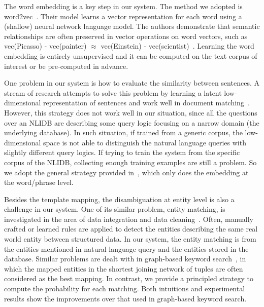 \documentclass{vldb}
\begin{document}
The word embedding is a key step in our system.  The method we adopted is word2vec~\cite{DBLP:journals/corr/abs-1301-3781}.  Their model learns a vector representation for each word using a (shallow) neural network language model.  The authors demonstrate that semantic relationships are often preserved in vector operations on word vectors, such as vec(Picasso) - vec(painter) $\approx$ vec(Einstein) - vec(scientist)~\cite{DBLP:conf/nips/MikolovSCCD13}.  Learning the word embedding is entirely unsupervised and it can be computed on the text corpus of interest or be pre-computed in advance. 

One problem in our system is how to evaluate the similarity between sentences.  A stream of research attempts to solve this problem by learning a latent low-dimensional representation of sentences and work well in document matching~\cite{DBLP:conf/icml/LeM14}.  However, this strategy does not work well in our situation, since all the questions over an NLIDB are describing some query logic focusing on a narrow domain (the underlying database).  In such situation, if trained from a generic corpus, the low-dimensional space is not able to distinguish the natural language queries with slightly different query logics.  If trying to train the system from the specific corpus of the NLIDB, collecting enough training examples are still a problem.  So we adopt the general strategy provided in~\cite{DBLP:conf/icml/KusnerGGW15}, which only does the embedding at the word/phrase level.  

Besides the template mapping, the disambiguation at entity level is also a challenge in our system.  One of its similar problem, entity matching, is investigated in the area of data integration and data cleaning~\cite{DBLP:journals/pvldb/GetoorM12}.  Often, manually crafted or learned rules are applied to detect the entities describing the same real world entity between structured data.  In our system, the entity matching is from the entities mentioned in natural language query and the entities stored in the database.  Similar problems are dealt with in graph-based keyword search~\cite{DBLP:conf/icde/BhalotiaHNCS02,DBLP:conf/icde/DingYWQZL07,DBLP:conf/sigmod/GolenbergKS08}, in which the mapped entities in the shortest joining network of tuples are often considered as the best mapping.  In contrast, we provide a principled strategy to compute the probability for each matching.  Both intuitions and experimental results show the improvements over that used in graph-based keyword search.  
\end{document}
